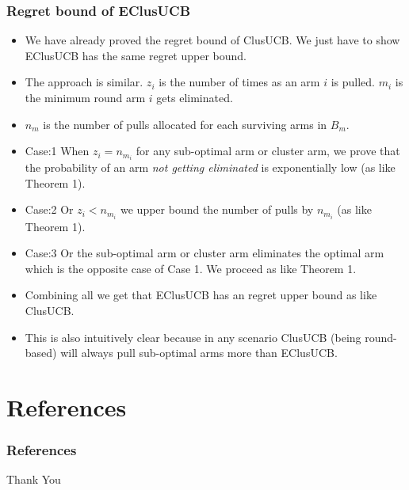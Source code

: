\documentclass{beamer}
\begin{document}
\begin{frame}[allowframebreaks]
\frametitle{Regret bound of EClusUCB}
\begin{itemize}
\item We have already proved the regret bound of ClusUCB. We just have to show EClusUCB has the same regret upper bound.
\item The approach is similar. $z_i$ is the number of times as an arm $i$ is pulled. $m_i$ is the minimum round arm $i$ gets eliminated. 
\item $n_{m}$ is the number of pulls allocated for each surviving arms in $B_m$. 
\item Case:1 When $z_i = n_{m_i}$ for any sub-optimal arm or cluster arm, we prove that the probability of an arm \emph{not getting eliminated} is exponentially low (as like Theorem 1).
\item Case:2 Or $z_i < n_{m_i}$ we upper bound the number of pulls by $n_{m_{i}}$ (as like Theorem 1).
\item Case:3 Or the sub-optimal arm or cluster arm eliminates the optimal arm which is the opposite case of Case 1. We proceed as like Theorem 1.
\item Combining all we get that EClusUCB has an regret upper bound as like ClusUCB. 
\item This is also intuitively clear because in any scenario ClusUCB (being round-based) will always pull sub-optimal arms more than EClusUCB.
\end{itemize}
\end{frame}



\section{References}
\begin{frame}[allowframebreaks]
\frametitle{References}
 

\end{frame}



\begin{frame}
\Huge{\centerline{Thank You}}
\end{frame}

\end{document}
